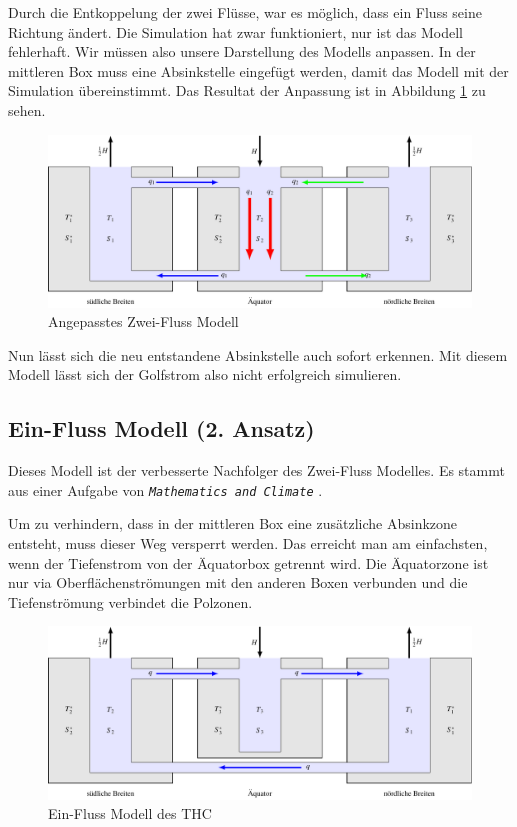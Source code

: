 Durch die Entkoppelung der zwei Flüsse, war es möglich, dass ein Fluss seine Richtung ändert.
Die Simulation hat zwar funktioniert, nur ist das Modell fehlerhaft. Wir müssen also unsere Darstellung des Modells anpassen. In der mittleren Box muss eine Absinkstelle eingefügt werden, damit das Modell mit der Simulation übereinstimmt. Das Resultat der Anpassung ist in Abbildung \ref{thermohalin:3b2f-inverted} zu sehen.

\begin{figure}
	\centering
	\includegraphics[width=14cm]{thermohalin/tikz/3b2f-inverted.pdf}
	\caption{Angepasstes Zwei-Fluss Modell}
	\label{thermohalin:3b2f-inverted}
\end{figure}

Nun lässt sich die neu entstandene Absinkstelle auch sofort erkennen. 
Mit diesem Modell lässt sich der Golfstrom also nicht erfolgreich simulieren. 

\subsection{Ein-Fluss Modell (2. Ansatz)}\label{thermohalin:3b1f_title}

Dieses Modell ist der verbesserte Nachfolger des Zwei-Fluss Modelles.
Es stammt aus einer Aufgabe von \texttt{\em Mathematics and Climate} \cite{skript:kaperengler}.

Um zu verhindern, dass in der mittleren Box eine zusätzliche Absinkzone entsteht, muss dieser Weg versperrt werden. Das erreicht man am einfachsten, wenn der Tiefenstrom von der Äquatorbox getrennt wird. Die Äquatorzone ist nur via Oberflächenströmungen mit den anderen Boxen verbunden und die Tiefenströmung verbindet die Polzonen.


\begin{figure}
	\centering
	\includegraphics[width=14cm]{thermohalin/tikz/3b1f.pdf}
	\caption{Ein-Fluss Modell des THC}
	\label{thermohalin:3b1f}
\end{figure}

